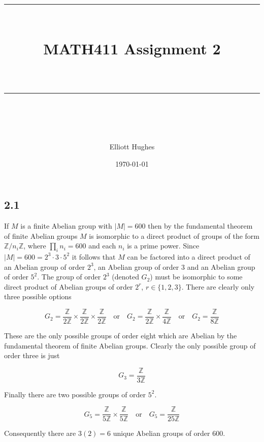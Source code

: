 \documentclass{article}
\title{	
	\normalfont\normalsize 
	\rule{\linewidth}{0.5pt}\\ %
	\vspace{14pt} %
	{\LARGE MATH411 Assignment 2\\ %
    \large \textit{} \\}
	\vspace{6pt} %
	\rule{\linewidth}{1pt}\\ %
}
\author{Elliott Hughes}
\date{\normalsize\today}
\begin{document}
\maketitle

\subsection*{2.1}
If $M$ is a finite Abelian group with $|M| = 600$ then by the fundamental theorem of finite 
Abelian groups $M$ is isomorphic to a direct product of groups of the form $\mathbb{Z}/n_i\mathbb{Z}$, 
where $\prod_i n_i = 600$ and each $n_i$ is a prime power. Since $|M| = 600 = 2^3\cdot 3 \cdot 5^2$ it follows that $M$ can be factored into a 
direct product of an Abelian group of order $2^3$, an Abelian group of order 3 and an Abelian group of order $5^2$. The 
group of order $2^3$ (denoted $G_2$) must be isomorphic to some direct product of Abelian groups of order $2^r$, $r \in \{1,2,3\}$. 
There are clearly only three possible options 

\begin{equation*}
    G_2 = \frac{\mathbb{Z}}{2\mathbb{Z}} \times \frac{\mathbb{Z}}{2\mathbb{Z}} \times \frac{\mathbb{Z}}{2\mathbb{Z}} \quad \text{or} \quad G_2 = \frac{\mathbb{Z}}{2\mathbb{Z}} \times \frac{\mathbb{Z}}{4\mathbb{Z}} \quad \text{or} \quad G_2 = \frac{\mathbb{Z}}{8\mathbb{Z}} 
\end{equation*}

These are the only possible groups of order eight which are Abelian by the fundamental theorem of 
finite Abelian groups. Clearly the only possible group of order three is just 

\begin{equation*}
    G_3 = \frac{\mathbb{Z}}{3\mathbb{Z}}
\end{equation*}

Finally there are two possible groups of order $5^2$. 

\begin{equation*}
    G_5 = \frac{\mathbb{Z}}{5\mathbb{Z}} \times \frac{\mathbb{Z}}{5\mathbb{Z}} \quad \text{or} \quad G_5 = \frac{\mathbb{Z}}{25\mathbb{Z}} 
\end{equation*}

Consequently there are $3(2) = 6$ unique Abelian groups of order 600.
\end{document}
